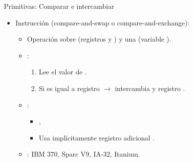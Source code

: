 \begin{frame}[t]{Primitivas: Comparar e intercambiar}
\begin{itemize}
  \item Instrucción  (compare-and-swap o compare-and-exchange):
    \begin{itemize}
      \item Operación sobre  (registros  y ) y una 
              (variable ).

      \item {}:
        \begin{enumerate}

          \item Lee el valor de .

          \item Si  es igual a registro  $\rightarrow$ intercambia  y registro .
        \end{enumerate}

      \item {}:
        \begin{itemize}
          \item {} , 
          \item Usa implícitamente registro adicional .
        \end{itemize}

      \item {}: IBM 370, Sparc V9, IA-32, Itanium.
    \end{itemize}
\end{itemize}
\end{frame}

